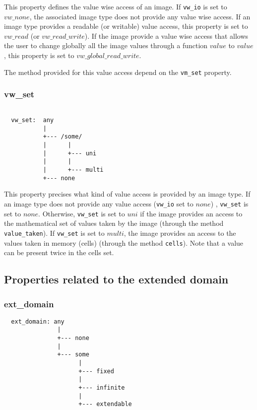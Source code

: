 This property defines the value wise access of an image.
If \verb+vw_io+ is set to $vw\_none$, the associated image type does not
 provide any value wise access.
If an image type provides a readable (or writable)
value access, this property is set to $vw\_read$ (or $vw\_read\_write$).
If the image provide a value wise access that allows the user to change
globally all the image values through a function $value$ to $value$,
this property is set to $vw\_global\_read\_write$.


The method provided for this value access depend on the \verb+vm_set+ property.


\subsubsection{vw\_set}

\begin{verbatim}

  vw_set:  any
           |
           +--- /some/
           |      |
           |      +--- uni
           |      |
           |      +--- multi
           +--- none
\end{verbatim}


This property precises what kind of value access is provided by an image type.
If an image type does not provide any value access (\verb+vw_io+ set to $none$)
, \verb+vw_set+ is set to $none$.
Otherwise, \verb+vw_set+ is set to $uni$ if the image provides an
access to the mathematical set of values taken by the image (through the method
\verb+value_taken+).
If \verb+vw_set+ is set to $multi$, the image provides an access to the values
taken in memory (cells) (through the method \verb+cells+). Note that a value
can be present twice in the cells set.



\subsection{Properties related to the extended domain}

\subsubsection{ext\_domain}

\begin{verbatim}
  ext_domain: any
               |
               +--- none
               |
               +--- some
                     |
                     +--- fixed
                     |
                     +--- infinite
                     |
                     +--- extendable
\end{verbatim}

